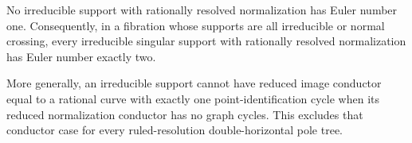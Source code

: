 
\begin{proposition}[P4.35]\hypertarget{tag-02X8}{}\label{night:P4.35}\label{stmt:P4.35}


No irreducible support with rationally resolved normalization
has Euler number one. Consequently, in a fibration whose
supports are all irreducible or normal crossing, every
irreducible singular support with rationally resolved
normalization has Euler number exactly two.

More generally, an irreducible support cannot have reduced
image conductor equal to a rational curve with exactly one
point-identification cycle when its reduced normalization
conductor has no graph cycles. This excludes that conductor
case for every ruled-resolution double-horizontal pole tree.
\end{proposition}


